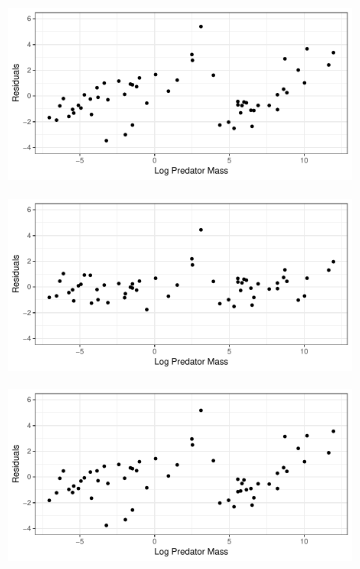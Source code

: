 \documentclass[11pt,a4paper]{article}
\begin{document}
	\begin{figure}[H]
		\centering %
		\begin{subfigure}[t]{0.6\linewidth}
			\includegraphics[width=\linewidth]{../Results/lin_mod_resid.pdf}
			\caption{}
		\end{subfigure}
		\begin{subfigure}[t]{0.6\linewidth}
			\includegraphics[width=\linewidth]{../Results/gam_mod_resid.pdf}
			\caption{}
		\end{subfigure}
		\begin{subfigure}[t]{0.6\linewidth}
			\includegraphics[width=\linewidth]{../Results/glmm_mod_resid.pdf}
			\caption{}
		\end{subfigure}
		\caption{}
		\label{fig:resid}
	\end{figure}
	
\end{document}
